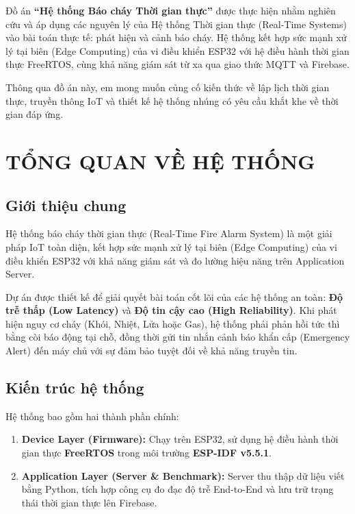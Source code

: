 \documentclass[12pt,a4paper]{report}
\begin{document}
Đồ án \textbf{``Hệ thống Báo cháy Thời gian thực''} được thực hiện nhằm nghiên cứu và áp dụng các nguyên lý của Hệ thống Thời gian thực (Real-Time Systems) vào bài toán thực tế: phát hiện và cảnh báo cháy. Hệ thống kết hợp sức mạnh xử lý tại biên (Edge Computing) của vi điều khiển ESP32 với hệ điều hành thời gian thực FreeRTOS, cùng khả năng giám sát từ xa qua giao thức MQTT và Firebase.

Thông qua đồ án này, em mong muốn củng cố kiến thức về lập lịch thời gian thực, truyền thông IoT và thiết kế hệ thống nhúng có yêu cầu khắt khe về thời gian đáp ứng.

\newpage
\tableofcontents
\newpage

\chapter{TỔNG QUAN VỀ HỆ THỐNG}

\section{Giới thiệu chung}
Hệ thống báo cháy thời gian thực (Real-Time Fire Alarm System) là một giải pháp IoT toàn diện, kết hợp sức mạnh xử lý tại biên (Edge Computing) của vi điều khiển ESP32 với khả năng giám sát và đo lường hiệu năng trên Application Server.

Dự án được thiết kế để giải quyết bài toán cốt lõi của các hệ thống an toàn: \textbf{Độ trễ thấp (Low Latency)} và \textbf{Độ tin cậy cao (High Reliability)}. Khi phát hiện nguy cơ cháy (Khói, Nhiệt, Lửa hoặc Gas), hệ thống phải phản hồi tức thì bằng còi báo động tại chỗ, đồng thời gửi tin nhắn cảnh báo khẩn cấp (Emergency Alert) đến máy chủ với sự đảm bảo tuyệt đối về khả năng truyền tin.

\section{Kiến trúc hệ thống}
Hệ thống bao gồm hai thành phần chính:
\begin{enumerate}
    \item \textbf{Device Layer (Firmware):} Chạy trên ESP32, sử dụng hệ điều hành thời gian thực \textbf{FreeRTOS} trong môi trường \textbf{ESP-IDF v5.5.1}.
    \item \textbf{Application Layer (Server \& Benchmark):} Server thu thập dữ liệu viết bằng Python, tích hợp công cụ đo đạc độ trễ End-to-End và lưu trữ trạng thái thời gian thực lên Firebase.
\end{enumerate}
\end{document}
